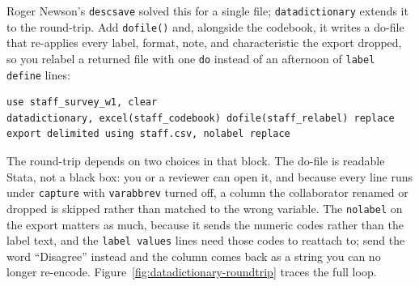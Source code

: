 \documentclass[
    a4paper,
    fontsize=10pt,
    twoside=true,
    numbers=noenddot,
]{kaobook}
\begin{document}
Roger Newson's \texttt{descsave} solved this for a single file; \texttt{datadictionary} extends it to the round-trip. Add \texttt{dofile()} and, alongside the codebook, it writes a do-file that re-applies every label, format, note, and characteristic the export dropped, so you relabel a returned file with one \texttt{do} instead of an afternoon of \texttt{label define} lines:
\par
{\footnotesize
\begin{verbatim}
use staff_survey_w1, clear
datadictionary, excel(staff_codebook) dofile(staff_relabel) replace
export delimited using staff.csv, nolabel replace
\end{verbatim}
}
The round-trip depends on two choices in that block. The do-file is readable Stata, not a black box: you or a reviewer can open it, and because every line runs under \texttt{capture} with \texttt{varabbrev} turned off, a column the collaborator renamed or dropped is skipped rather than matched to the wrong variable. The \texttt{nolabel} on the export matters as much, because it sends the numeric codes rather than the label text, and the \texttt{label values} lines need those codes to reattach to; send the word \enquote{Disagree} instead and the column comes back as a string you can no longer re-encode. Figure~\ref{fig:datadictionary-roundtrip} traces the full loop.
\end{document}
